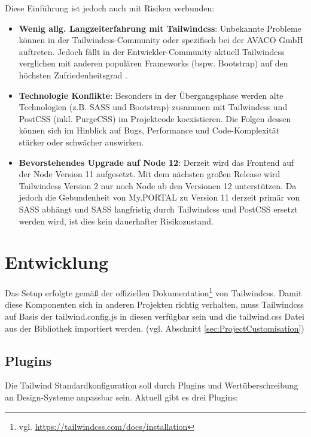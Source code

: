 Diese Einführung ist jedoch auch mit Risiken verbunden:
\begin{itemize}
  \item \textbf{Wenig allg. Langzeiterfahrung mit Tailwindcss}: Unbekannte Probleme können in der Tailwindcss-Community oder spezifisch bei der AVACO GmbH auftreten. Jedoch fällt in der Entwickler-Community  aktuell Tailwindcss verglichen mit anderen populären Frameworks (bspw. Bootstrap) auf den höchsten Zufriedenheitsgrad \citep{StateCSS2019_Frameworks}.
  \item \textbf{Technologie Konflikte}: Besonders in der Übergangsphase werden alte Technologien (z.B. SASS und Bootstrap) zusammen mit Tailwindcss und PostCSS (inkl. PurgeCSS) im Projektcode koexistieren. Die Folgen dessen können sich im Hinblick auf Bugs, Performance und Code-Komplexität stärker oder schwächer auswirken.
  \item \textbf{Bevorstehendes Upgrade auf Node 12}: Derzeit wird das Frontend auf der Node Version 11 aufgesetzt. Mit dem nächsten großen Release wird Tailwindcss Version 2 nur noch Node ab den Versionen 12 unterstützen. Da jedoch die Gebundenheit von My.PORTAL zu Version 11 derzeit primär von SASS abhängt und SASS langfristig durch Tailwindcss und PostCSS ersetzt werden wird, ist dies kein dauerhafter Risikozustand.
\end{itemize}

\section{Entwicklung}
Das Setup erfolgte gemäß der offiziellen Dokumentation\footnote{vgl. \url{https://tailwindcss.com/docs/installation}} von Tailwindcss. Damit diese Komponenten sich in anderen Projekten richtig verhalten, muss Tailwindcss auf Basis der tailwind.config.js in diesen verfügbar sein und die tailwind.css Datei aus der Bibliothek importiert werden. (vgl. Abschnitt \ref{sec:ProjectCustomisation})


\subsection{Plugins}
Die Tailwind Standardkonfiguration soll durch Plugins und Wertüberschreibung an Design-Systeme anpassbar sein. Aktuell gibt es drei Plugins:

